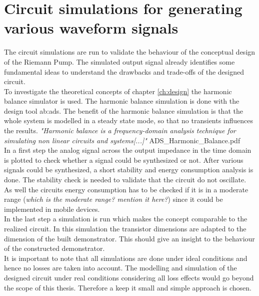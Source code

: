 \chapter{Circuit simulations for generating various waveform signals}
The circuit simulations are run to validate the behaviour of the conceptual design of the Riemann Pump. The simulated output signal already identifies some fundamental ideas to understand the drawbacks and trade-offs of the designed circuit.\\
To investigate the theoretical concepts of chapter \ref{ch:design} the harmonic balance simulator is used.
The harmonic balance simulation is done with the design tool \gls{ab:ads}.
The benefit of the harmonic balance simulation is that the whole system is modelled in a steady state mode, so that no transients influences the results. \textit{"Harmonic balance is a frequency-domain analysis technique for simulating non linear circuits and systems[...]"}  ADS\_Harmonic\_Balance.pdf\\
In a first step the analog signal across the output impedance in the time domain is plotted to check whether a signal could be synthesized or not. 
After various signals could be synthesized, a short stability and energy consumption analysis is done.
The stability check is needed to validate that the circuit do not oscillate.
As well the circuits energy consumption has to be checked if it is in a moderate range (\textit{which is the moderate range? mention it here?}) since it could be implemented in mobile devices.\\
    In the last step a simulation is run which makes the concept comparable to the realized circuit. 
   In this simulation the transistor dimensions are adapted to the dimension of the built demonstrator. 
   This should give an insight to the behaviour of the constructed demonstrator.\\
   It is important to note that all simulations are done under ideal conditions and hence no losses are taken into account. 
    The modelling and simulation of the designed circuit under real conditions considering all loss effects would go beyond the scope of this thesis. Therefore a keep it small and simple approach is chosen.\\   

